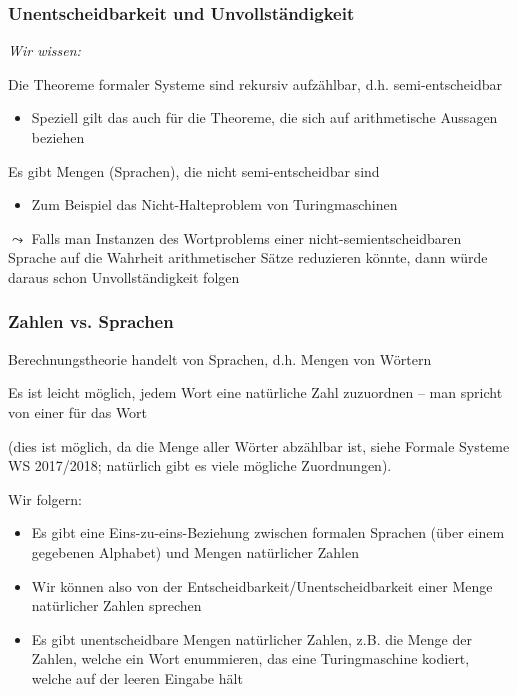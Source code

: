 \documentclass[aspectratio=1610,onlymath]{beamer}
\begin{document}
\begin{frame}\frametitle{Unentscheidbarkeit und Unvollständigkeit}

\emph{Wir wissen:}\medskip

Die Theoreme formaler Systeme sind rekursiv aufzählbar, d.h. semi-entscheidbar
\begin{itemize}
\item Speziell gilt das auch für die Theoreme, die sich auf arithmetische Aussagen beziehen
\end{itemize}\medskip

Es gibt Mengen (Sprachen), die nicht semi-entscheidbar sind
\begin{itemize}
\item Zum Beispiel das Nicht-Halteproblem von Turingmaschinen
\end{itemize}
\bigskip\pause

\alert{
$\leadsto$ Falls man Instanzen des Wortproblems einer nicht-semientscheidbaren Sprache auf die Wahrheit arithmetischer Sätze reduzieren könnte, dann würde daraus schon Unvollständigkeit folgen}

\end{frame}

\begin{frame}\frametitle{Zahlen vs. Sprachen}

Berechnungstheorie handelt von Sprachen, d.h. Mengen von Wörtern
\bigskip

Es ist leicht möglich, jedem Wort eine natürliche Zahl zuzuordnen -- man spricht von einer  für das Wort\\[0.5ex]
{\tiny(dies ist möglich, da die Menge aller Wörter abzählbar ist, siehe Formale Systeme WS 2017/2018; natürlich gibt es viele mögliche Zuordnungen).

}
\bigskip\pause

Wir folgern:
\begin{itemize}
\item Es gibt eine Eins-zu-eins-Beziehung zwischen formalen Sprachen (über einem gegebenen Alphabet) und Mengen natürlicher Zahlen
\item Wir können also von der Entscheidbarkeit/Unentscheidbarkeit einer Menge natürlicher Zahlen sprechen
\item Es gibt unentscheidbare Mengen natürlicher Zahlen, z.B. die Menge der Zahlen, welche ein Wort enummieren, das eine Turingmaschine kodiert, welche auf der leeren Eingabe hält
\end{itemize}

\end{frame}
\end{document}

